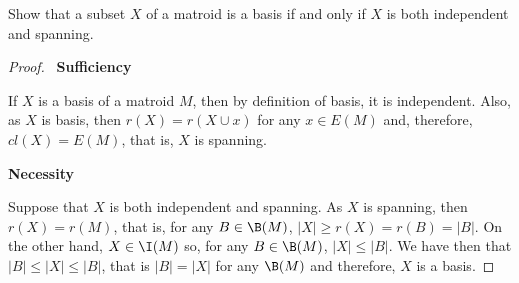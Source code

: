 \prob
{
    Show that a subset $X$ of a matroid is a basis if and only if $X$ is both independent and spanning.
}
\begin{proof}
    $\,$\pn
    \textbf{Sufficiency}\pn

    If $X$ is a basis of a matroid $M$, then by definition of basis, it is independent. Also, as $X$ is
    basis, then $r(X) = r(X \cup x)$ for any $x \in E(M)$ and, therefore, $cl(X) = E(M)$, that is, $X$ is spanning.\pn
    
    \textbf{Necessity}\pn
    
    Suppose that $X$ is both independent and spanning. As $X$ is spanning, then $r(X) = r(M)$, that is, for any $B \in \B(M)$,  
    $|X| \geq r(X) = r(B) = |B|$. On the other hand, $X \in \I(M)$ so, for any $B \in \B(M)$, $|X| \leq |B|$. We have then that
    $|B| \leq |X| \leq |B|$, that is $|B| = |X|$ for any $\B(M)$ and therefore, $X$ is a basis.
    
\end{proof}